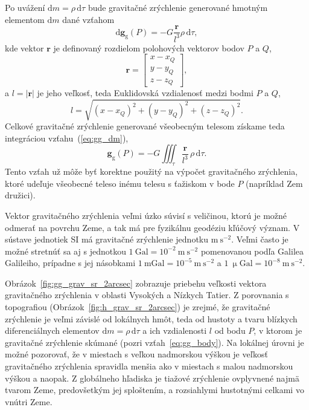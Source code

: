 \documentclass[a4paper, 12pt]{book}
\newcommand{\diff}{\mathrm d}
\newcommand{\gidx}{\mathrm g}
\let\vec\mathbf
\begin{document}
Po uvážení $\diff m = \rho \, \diff \tau$ bude gravitačné zrýchlenie generované 
hmotným elementom $\diff m$ dané vzťahom
%
\begin{equation}
\label{eq:gg_dm}
\diff \vec g_\gidx(P) = -G \frac{\vec r}{l^3} \rho \, \diff\tau{,}
\end{equation}
%
kde vektor $\vec r$ je definovaný rozdielom polohových vektorov bodov $P$ 
a $Q$,
%
\begin{equation}
\label{eq:r}
\vec r = 
%
\begin{bmatrix}
x - x_Q \\
y - y_Q \\
z - z_Q
\end{bmatrix}
{,}
\end{equation}
%
a $l = | \vec r |$ je jeho veľkosť, teda Euklidovská vzdialenosť medzi bodmi 
$P$ a $Q$,
%
\begin{equation}
\label{eq:l}
l = \sqrt{(x - x_Q)^2 + (y - y_Q)^2 + (z - z_Q)^2}{.}
\end{equation}
%
Celkové gravitačné zrýchlenie generované všeobecným telesom získame teda 
integráciou vzťahu~(\ref{eq:gg_dm}),
%
\begin{equation}
\label{eq:gg_body}
\vec g_\gidx(P) = -G \iiint_{\tau} \frac{\vec r}{l^3} \, \rho \, \diff\tau{.}
\end{equation}
%
Tento vzťah už môže byť korektne použitý na výpočet gravitačného zrýchlenia, 
ktoré udeľuje všeobecné teleso inému telesu s ťažiskom v bode $P$ (napríklad 
Zem družici).

Vektor gravitačného zrýchlenia veľmi úzko súvisí s veličinou, ktorú je možné 
odmerať na povrchu Zeme, a tak má pre fyzikálnu geodéziu kľúčový význam.  
V sústave jednotiek SI má gravitačné zrýchlenie jednotku $\mathrm{m}\ 
\mathrm{s}^{-2}$.  Veľmi často je možné stretnúť sa aj s jednotkou $1\ 
\mathrm{Gal} = 10^{-2}\ \mathrm{m}\ \mathrm{s}^{-2}$ pomenovanou podľa Galilea 
Galileiho, prípadne s jej násobkami $1\ \mathrm{mGal} = 10^{-5}\ \mathrm{m}\ 
\mathrm{s}^{-2}$ a $1\ \upmu \mathrm{Gal} = 10^{-8}\ \mathrm{m}\ 
\mathrm{s}^{-2}$.

Obrázok~\ref{fig:gg_grav_sr_2arcsec} zobrazuje priebehu veľkosti vektora 
gravitačného zrýchlenia v oblasti Vysokých a Nízkych Tatier.  Z porovnania 
s topografiou (Obrázok~\ref{fig:h_grav_sr_2arcsec}) je zrejmé, že gravitačné 
zrýchlenie je veľmi závislé od lokálnych hmôt, teda od hustoty a tvaru blízkych 
diferenciálnych elementov $\diff m = \rho \, \diff \tau$ a ich vzdialenosti $l$ 
od bodu $P$, v ktorom je gravitačné zrýchlenie skúmané (pozri 
vzťah~\ref{eq:gg_body}).  Na lokálnej úrovni je možné pozorovať, že v miestach 
s veľkou nadmorskou výškou je veľkosť gravitačného zrýchlenia spravidla menšia 
ako v miestach s malou nadmorskou výškou a naopak.  Z globálneho hľadiska je 
tiažové zrýchlenie ovplyvnené najmä tvarom Zeme, predovšetkým jej sploštením, 
a rozsiahlymi hustotnými celkami vo vnútri Zeme.
\end{document}
